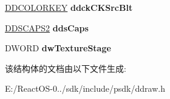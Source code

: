 \begin{DoxyCompactItemize}
\item 
\mbox{\label{struct___d_d_s_u_r_f_a_c_e_d_e_s_c2_ab269e00b858c8ce7fe39eea207062c40}} 
\hyperlink{struct_d_d_c_o_l_o_r_k_e_y}{D\+D\+C\+O\+L\+O\+R\+K\+EY} {\bfseries ddck\+C\+K\+Src\+Blt}
\item 
\mbox{\label{struct___d_d_s_u_r_f_a_c_e_d_e_s_c2_a112287b474f819c2ad3447924a925198}} 
\hyperlink{struct___d_d_s_c_a_p_s2}{D\+D\+S\+C\+A\+P\+S2} {\bfseries dds\+Caps}
\item 
\mbox{\label{struct___d_d_s_u_r_f_a_c_e_d_e_s_c2_a8e708085a28d911680327024e7c0efb8}} 
D\+W\+O\+RD {\bfseries dw\+Texture\+Stage}
\end{DoxyCompactItemize}


该结构体的文档由以下文件生成\+:\begin{DoxyCompactItemize}
\item 
E\+:/\+React\+O\+S-\/0../sdk/include/psdk/ddraw.\+h\end{DoxyCompactItemize}
